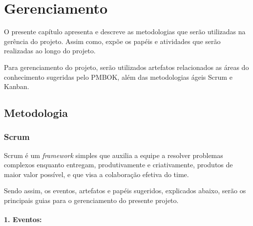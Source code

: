 \chapter[Gerenciamento]{Gerenciamento}

O presente capítulo apresenta e descreve as metodologias que serão utilizadas na gerência do projeto. Assim como, expõe os papéis e atividades que serão realizadas ao longo do projeto.

Para gerenciamento do projeto, serão utilizados artefatos relacionados as áreas do conhecimento sugeridas pelo PMBOK, além das metodologias ágeis Scrum e Kanban.

\section{Metodologia}

\subsection{Scrum}
Scrum é um \textit{framework} simples que auxilia a equipe a resolver problemas complexos enquanto entregam, produtivamente e criativamente, produtos de maior valor possível, e que visa a colaboração efetiva do time. \cite{SCRUM.ORG_2020}

Sendo assim, os eventos, artefatos e papéis sugeridos, explicados abaixo, serão os principais guias para o gerenciamento do presente projeto.

\subsubsection*{1. Eventos:}

